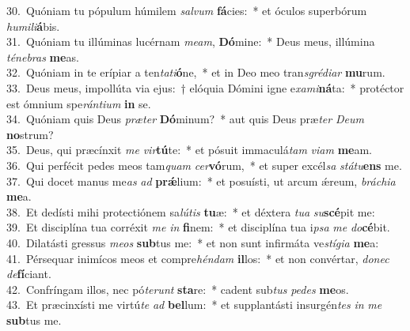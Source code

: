{30.~}Quóniam tu pópulum húmilem \textit{sal}\textit{vum} \textbf{fá}cies:~* et óculos superbórum \textit{hu}\textit{mi}\textit{li}\textbf{á}bis.\\
{31.~}Quóniam tu illúminas lucérnam \textit{me}\textit{am}, \textbf{Dó}mine:~* Deus meus, illúmina \textit{té}\textit{ne}\textit{bras} \textbf{me}as.\\
{32.~}Quóniam in te erípiar a ten\textit{ta}\textit{ti}\textbf{ó}ne,~* et in Deo meo tran\textit{sgré}\textit{di}\textit{ar} \textbf{mu}rum.\\
{33.~}Deus meus, impollúta via ejus:~† elóquia Dómini igne e\textit{xa}\textit{mi}\textbf{ná}ta:~* protéctor est ómnium spe\textit{rán}\textit{ti}\textit{um} \textbf{in} se.\\
{34.~}Quóniam quis Deus \textit{præ}\textit{ter} \textbf{Dó}minum?~* aut quis Deus præ\textit{ter} \textit{De}\textit{um} \textbf{no}strum?\\
{35.~}Deus, qui præcínxit \textit{me} \textit{vir}\textbf{tú}te:~* et pósuit immaculá\textit{tam} \textit{vi}\textit{am} \textbf{me}am.\\
{36.~}Qui perfécit pedes meos tam\textit{quam} \textit{cer}\textbf{vó}rum,~* et super excél\textit{sa} \textit{stá}\textit{tu}\textbf{ens} me.\\
{37.~}Qui docet manus me\textit{as} \textit{ad} \textbf{prǽ}lium:~* et posuísti, ut arcum ǽreum, \textit{brá}\textit{chi}\textit{a} \textbf{me}a.\\
{38.~}Et dedísti mihi protectiónem sa\textit{lú}\textit{tis} \textbf{tu}æ:~* et déxtera \textit{tu}\textit{a} \textit{su}\textbf{scé}pit me:\\
{39.~}Et disciplína tua corréxit \textit{me} \textit{in} \textbf{fi}nem:~* et disciplína tua i\textit{psa} \textit{me} \textit{do}\textbf{cé}bit.\\
{40.~}Dilatásti gressus \textit{me}\textit{os} \textbf{sub}tus me:~* et non sunt infirmáta ve\textit{stí}\textit{gi}\textit{a} \textbf{me}a:\\
{41.~}Pérsequar inimícos meos et compre\textit{hén}\textit{dam} \textbf{il}los:~* et non convértar, \textit{do}\textit{nec} \textit{de}\textbf{fí}ciant.\\
{42.~}Confríngam illos, nec pó\textit{te}\textit{runt} \textbf{sta}re:~* cadent sub\textit{tus} \textit{pe}\textit{des} \textbf{me}os.\\
{43.~}Et præcinxísti me virtú\textit{te} \textit{ad} \textbf{bel}lum:~* et supplantásti insurgén\textit{tes} \textit{in} \textit{me} \textbf{sub}tus me.\\

